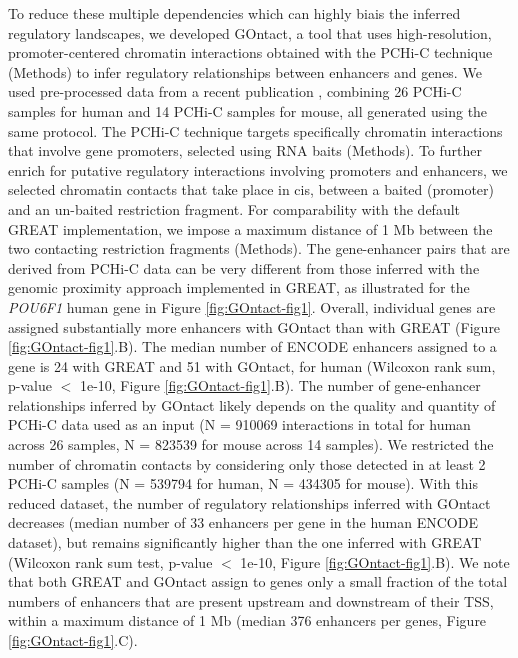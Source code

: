 To reduce these multiple dependencies which can highly biais the inferred regulatory landscapes, we developed GOntact, a tool that uses high-resolution, promoter-centered chromatin interactions obtained with the PCHi-C technique (Methods) to infer regulatory relationships between enhancers and genes. We used pre-processed data from a recent publication \citep{laverre_long-range_2022}, combining 26 PCHi-C samples for human and 14 PCHi-C samples for mouse, all generated using the same protocol. The PCHi-C technique targets specifically chromatin interactions that involve gene promoters, selected using RNA baits (Methods). To further enrich for putative regulatory interactions involving promoters and enhancers, we selected chromatin contacts that take place in cis, between a baited (promoter) and an un-baited restriction fragment. For comparability with the default GREAT implementation, we impose a maximum distance of 1 Mb between the two contacting restriction fragments (Methods). The gene-enhancer pairs that are derived from PCHi-C data can be very different from those inferred with the genomic proximity approach implemented in GREAT, as illustrated for the \textit{POU6F1} human gene in Figure \ref{fig:GOntact-fig1}. Overall, individual genes are assigned substantially more enhancers with GOntact than with GREAT (Figure \ref{fig:GOntact-fig1}.B). The median number of ENCODE enhancers assigned to a gene is 24 with GREAT and 51 with GOntact, for human (Wilcoxon rank sum, p-value $<$ 1e-10, Figure \ref{fig:GOntact-fig1}.B). The number of gene-enhancer relationships inferred by GOntact likely depends on the quality and quantity of PCHi-C data used as an input (N = 910069 interactions in total for human across 26 samples, N = 823539 for mouse across 14 samples). We restricted the number of chromatin contacts by considering only those detected in at least 2 PCHi-C samples (N = 539794 for human, N = 434305 for mouse). With this reduced dataset, the number of regulatory relationships inferred with GOntact decreases (median number of 33 enhancers per gene in the human ENCODE dataset), but remains significantly higher than the one inferred with GREAT (Wilcoxon rank sum test, p-value $<$ 1e-10, Figure \ref{fig:GOntact-fig1}.B). We note that both GREAT and GOntact assign to genes only a small fraction of the total numbers of enhancers that are present upstream and downstream of their TSS, within a maximum distance of 1 Mb (median 376 enhancers per genes, Figure \ref{fig:GOntact-fig1}.C). \\

